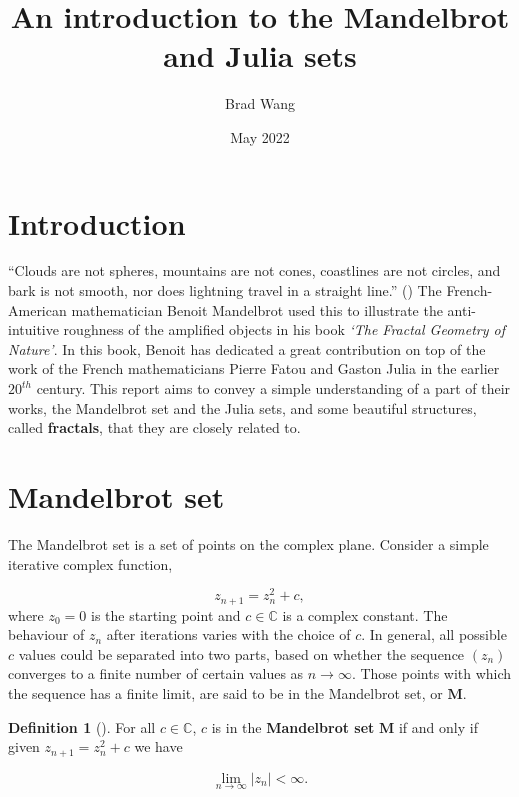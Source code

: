 \documentclass[a4paper,11pt]{article}
\title{An introduction to the Mandelbrot and Julia sets}
\author{Brad Wang}
\date{May 2022}
\theoremstyle{definition}
\newtheorem{defn}[prop]{Definition}
\begin{document}
\maketitle

\section{Introduction}

``Clouds are not spheres, mountains are not cones, coastlines are not circles, and bark is not smooth, nor does lightning travel in a straight line.” (\autocite[Theme]{mandelbrot}) The French-American mathematician Benoit Mandelbrot used this to illustrate the anti-intuitive roughness of the amplified objects in his book \emph{`The Fractal Geometry of Nature'}. In this book, Benoit has dedicated a great contribution on top of the work of the French mathematicians Pierre Fatou and Gaston Julia in the earlier $20^{th}$ century. This report aims to convey a simple understanding of a part of their works, the Mandelbrot set and the Julia sets, and some beautiful structures, called \textbf{fractals}, that they are closely related to.

\section{Mandelbrot set}

The Mandelbrot set is a set of points on the complex plane. Consider a simple iterative complex function,

\begin{equation*}
z_{n+1} = z_n^2 + c, 
\end{equation*}
where $z_0 = 0$ is the starting point and $c\in\mathbb{C}$ is a complex constant. The behaviour of $z_n$ after iterations varies with the choice of $c$. In general, all possible $c$ values could be separated into two parts, based on whether the sequence $(z_n)$ converges to a finite number of certain values as $n\rightarrow\infty$. Those points with which the sequence has a finite limit, are said to be in the Mandelbrot set, or $\mathbf{M}$.

\begin{defn}[{\autocite[Section 3.1]{fredriksson}}]\label{thm:Mts}
For all $c\in\mathbb{C}$, $c$ is in the \textbf{Mandelbrot set} $\mathbf{M}$ if and only if given $z_{n+1} = z_n^2+c$ we have 

\begin{equation*}
\lim_{n\rightarrow\infty}|z_n| < \infty.
\end{equation*}
\end{defn}
\end{document}
